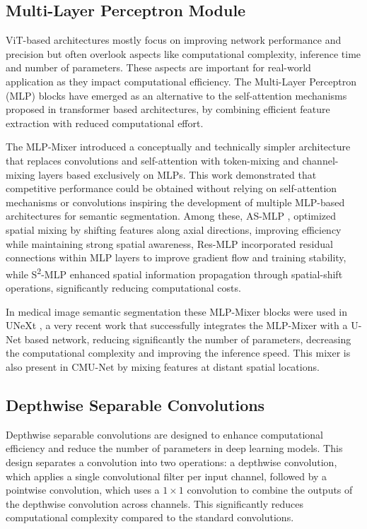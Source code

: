 \documentclass[lettersize,journal]{IEEEtran}
\begin{document}
\subsection{Multi-Layer Perceptron Module}
ViT-based architectures mostly focus on improving network performance and precision but often overlook aspects like computational complexity, inference time and number of parameters. These aspects are important for real-world application as they impact computational efficiency. The Multi-Layer Perceptron (MLP) blocks have emerged as an alternative to the self-attention mechanisms proposed in transformer based architectures, by combining efficient feature extraction with reduced computational effort. 

The MLP-Mixer \cite{tolstikhin2021mlp} introduced a conceptually and technically simpler architecture that replaces convolutions and self-attention with token-mixing and channel-mixing layers based exclusively on MLPs. This work demonstrated that competitive performance could be obtained without relying on self-attention mechanisms or convolutions inspiring the development of multiple MLP-based architectures for semantic segmentation. Among these, AS-MLP \cite{lian2021mlp}, optimized spatial mixing by shifting features along axial directions, improving efficiency while maintaining strong spatial awareness, Res-MLP \cite{touvron2022resmlp} incorporated residual connections within MLP layers to improve gradient flow and training stability, while S\textsuperscript{2}-MLP \cite{yu2022s2} enhanced spatial information propagation through spatial-shift operations, significantly reducing computational costs.

In medical image semantic segmentation these MLP-Mixer blocks were used in UNeXt \cite{chang2024unext}, a very recent work that successfully integrates the MLP-Mixer with a U-Net based network, reducing significantly the number of parameters, decreasing the computational complexity and improving the inference speed. This mixer is also present in CMU-Net \cite{tang2023cmu} by mixing features at distant spatial locations.


\subsection{Depthwise Separable Convolutions}
Depthwise separable convolutions are designed to enhance computational efficiency and reduce the number of parameters in deep learning models. This design separates a convolution into two operations: a depthwise convolution, which applies a single convolutional filter per input channel, followed by a pointwise convolution, which uses a $1\times1$ convolution to combine the outputs of the depthwise convolution across channels. This significantly reduces computational complexity compared to the standard convolutions.
\end{document}
